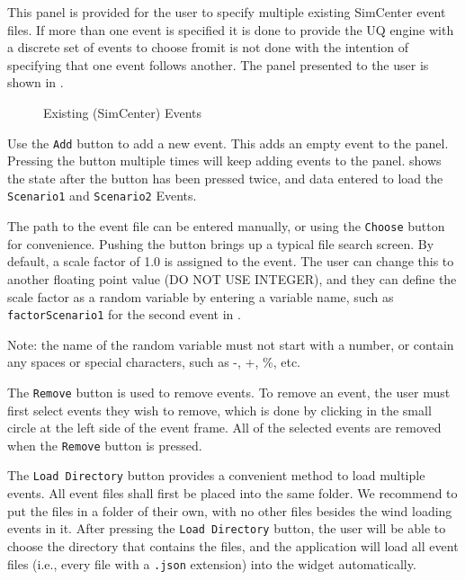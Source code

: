 This panel is provided for the user to specify multiple existing SimCenter
event files.  If more than one event is specified it is done to
provide the UQ engine with a discrete set of events to choose
from\textemdash it is not done with the intention of specifying that
one event follows another.  The panel presented to the user
is shown in .

\begin{figure}[!htbp]
  \caption{Existing (SimCenter) Events }
  \label{fig:SC_event_panel}
\end{figure}

Use the \texttt{Add} button to add a new event. This adds an empty
event to the panel. Pressing the button multiple times will keep
adding events to the panel.  shows the state
after the button has been pressed twice, and data entered to load
the \texttt{Scenario1} and \texttt{Scenario2} Events.

The path to the event file can be entered manually, or using
the \texttt{Choose} button for convenience. Pushing the button brings
up a typical file search screen. By default, a scale factor of 1.0 is
assigned to the event.  The user can change this to another floating
point value (DO NOT USE INTEGER), and they can define the scale factor
as a random variable by entering a variable name, such
as \texttt{factorScenario1} for the second event
in .

Note: the name of the random variable must not start with a number, or
contain any spaces or special characters, such as -, +, \%, etc.

The \texttt{Remove} button is used to remove events. To remove an
event, the user must first select events they wish to remove, which is
done by clicking in the small circle at the left side of the event
frame. All of the selected events are removed when the \texttt{Remove}
button is pressed.

The \texttt{Load Directory} button provides a convenient method to
load multiple events. All event files shall first be placed into the
same folder. We recommend to put the files in a folder of their own,
with no other files besides the wind loading events in it. After
pressing the \texttt{Load Directory} button, the user will be able to
choose the directory that contains the files, and the application will
load all event files (i.e., every file with a \texttt{.json}
extension) into the widget automatically.

